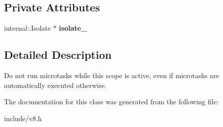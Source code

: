 \subsection*{Private Attributes}
\begin{DoxyCompactItemize}
\item 
internal\+::\+Isolate $\ast$ {\bfseries isolate\+\_\+}\hypertarget{classv8_1_1_isolate_1_1_suppress_microtask_execution_scope_a1d3f31824c96bc8db01a0eb8bb6137d4}{}\label{classv8_1_1_isolate_1_1_suppress_microtask_execution_scope_a1d3f31824c96bc8db01a0eb8bb6137d4}

\end{DoxyCompactItemize}


\subsection{Detailed Description}
Do not run microtasks while this scope is active, even if microtasks are automatically executed otherwise. 

The documentation for this class was generated from the following file\+:\begin{DoxyCompactItemize}
\item 
include/v8.\+h\end{DoxyCompactItemize}
